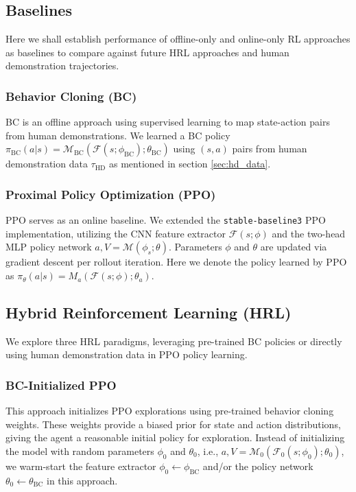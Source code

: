 \documentclass{article}
\begin{document}
\subsection{Baselines}
Here we shall establish performance of offline-only and online-only RL approaches
as baselines to compare against future HRL approaches and human demonstration trajectories. 

\subsubsection{Behavior Cloning (BC)} 
BC is an offline approach using supervised 
learning to map state-action pairs from human demonstrations. We learned 
a BC policy $\pi_{\text{BC}}(a|s) =
\mathcal{M}_{\text{BC}}(\mathcal{F}(s;\phi_{\text{BC}});\theta_{\text{BC}})$
using $(s,a)$ pairs from human demonstration data $\tau_{\text{HD}}$ as mentioned
in section \ref{sec:hd_data}.

\subsubsection{Proximal Policy Optimization (PPO)} 
PPO serves as an online baseline. We extended the 
\texttt{stable-baseline3} PPO implementation, utilizing the 
CNN feature extractor $\mathcal{F}(s;\phi)$ and the two-head 
MLP policy network $a, V = \mathcal{M}(\phi_s; \theta)$. 
Parameters $\phi$ and $\theta$ are updated via gradient 
descent per rollout iteration.
Here we denote the policy learned by PPO as 
$\pi_\theta(a|s) = M_a(\mathcal{F}(s;\phi);\theta_a)$.


\subsection{Hybrid Reinforcement Learning (HRL)}
We explore three HRL paradigms, leveraging pre-trained BC policies or 
directly using human demonstration data in PPO policy learning.

\subsubsection{BC-Initialized PPO}
This approach initializes PPO explorations using pre-trained behavior 
cloning weights. These weights provide a biased prior for state and 
action distributions, giving the agent a reasonable initial policy 
for exploration. 
Instead of initializing the model with random parameters 
$\phi_0$ and $\theta_0$, i.e., $a, V = \mathcal{M}_0(\mathcal{F}_0(s;\phi_0); 
\theta_0)$, we warm-start the feature extractor $\phi_0 \leftarrow 
\phi_{\text{BC}}$ and/or the policy network $\theta_0 \leftarrow 
\theta_{\text{BC}}$ in this approach.
\end{document}
